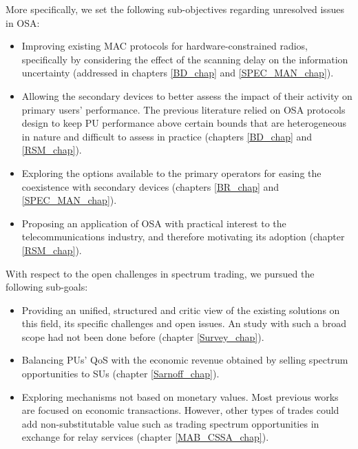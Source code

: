 More specifically, we set the following sub-objectives regarding unresolved issues in OSA: 
\begin{itemize}
\item Improving existing MAC protocols for hardware-constrained radios, specifically by considering the effect of the scanning delay on the information uncertainty (addressed in chapters \ref{BD_chap} and \ref{SPEC_MAN_chap}).
\item Allowing the secondary devices to better assess the impact of their activity on primary users' performance. The previous literature relied on OSA protocols design to keep PU performance above certain bounds that are heterogeneous in nature and difficult to assess in practice (chapters \ref{BD_chap} and \ref{RSM_chap}).
\item Exploring the options available to the primary operators for easing the coexistence with secondary devices (chapters \ref{BR_chap} and \ref{SPEC_MAN_chap}).
\item Proposing an application of OSA with practical interest to the telecommunications industry, and therefore motivating its adoption (chapter \ref{RSM_chap}).
\end{itemize}

With respect to the open challenges in spectrum trading, we pursued the following sub-goals:
\begin{itemize}
\item Providing an unified, structured and critic view of the existing solutions on this field, its specific challenges and open issues. An study with such a broad scope had not been done before (chapter \ref{Survey_chap}).
\item Balancing PUs' QoS with the economic revenue obtained by selling spectrum opportunities to SUs (chapter \ref{Sarnoff_chap}). 
\item Exploring mechanisms not based on monetary values. Most previous works are focused on economic transactions. However, other types of trades could add non-substitutable value such as trading spectrum opportunities in exchange for relay services (chapter \ref{MAB_CSSA_chap}).
\end{itemize}

